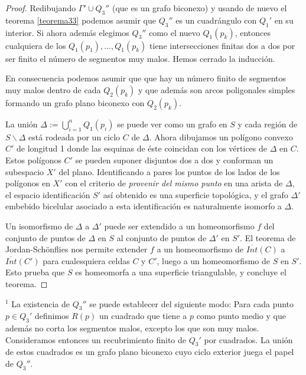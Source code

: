 \begin{proof}
	Redibujando $\Gamma' \cup Q_{3}''$	(que es un grafo biconexo) y usando de nuevo el teorema \ref{teorema33} podemos asumir  que $Q_{3}''$ es un cuadrángulo con $Q_{1}'$ en su interior. Si ahora además elegimos $Q_{3}''$ como el nuevo $Q_{1}(p_k)$, entonces cualquiera de los $Q_{1}(p_1),..., Q_{1}(p_k)$ tiene intersecciones finitas dos a dos por ser finito el número de segmentos muy malos. Hemos cerrado la inducción.
 
	En consecuencia podemos asumir que que hay un número finito de segmentos muy malos dentro de cada $Q_{2}(p_k)$ y que además son arcos poligonales simples formando un grafo plano biconexo con $Q_{2}(p_k)$.

	La unión $\Delta:=\bigcup_{i = 1}^{n} Q_{1}(p_i)$ se puede ver como un grafo  en $S$ y cada región de $S \backslash \Delta$ está rodeada por un ciclo $C$ de $\Delta$. Ahora dibujamos un polígono convexo $C'$ de longitud 1 donde las esquinas de éste coincidan con los vértices de $\Delta$ en  $C$. Estos polígonos $C'$ se pueden suponer disjuntos dos a dos y conforman un subespacio $X'$ del plano. Identificando a pares los puntos de los lados de los polígonos en $X'$ con el criterio de {\em provenir del mismo punto} en una  arista de $\Delta$, el espacio identificación  $S'$ así obtenido es una superficie topológica, y el  grafo $\Delta'$ embebido bicelular asociado a esta identificación es naturalmente isomorfo a $\Delta$.

	Un isomorfismo de $\Delta$ a $\Delta'$ puede ser extendido a un homeomorfismo $f$ del conjunto de puntos de $\Delta$ en $S$ al conjunto de puntos de $\Delta'$ en $S'$. El teorema de Jordan-Schönflies nos permite extender $f$   a un homeomorfismo de $\overline{Int}(C)$ a $\overline{Int}(C')$ para cualesquiera celdas $C$ y $C'$, luego a un homeomorfismo de $S$ en $S'$. Esto prueba que $S$ es homeomorfa a una superficie triangulable, y concluye el teorema.
\end{proof}

	$^{1}$ La existencia de $Q_{3}''$ se puede establecer del siguiente modo: Para cada punto $p \in Q_{3}'$ definimos $R(p)$ un cuadrado que tiene a $p$ como punto medio y que además no corta los segmentos malos, excepto los que son muy malos. Consideramos entonces un recubrimiento finito de $Q_{3}'$ por cuadrados. La unión de estos cuadrados es un grafo plano biconexo cuyo ciclo exterior juega el papel de $Q_{3}''$.


